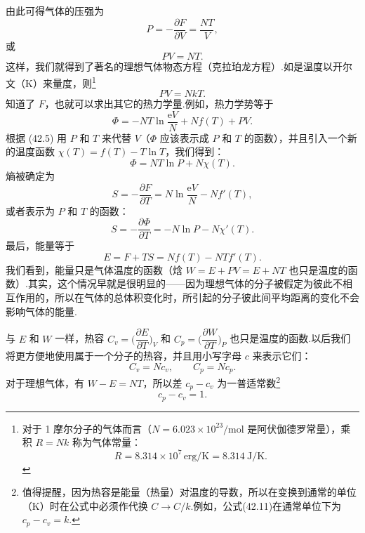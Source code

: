 由此可得气体的压强为
\begin{equation*}
  P=-\frac{\partial F}{\partial V}=\frac{NT}{V},
\end{equation*}
或
\begin{equation}
  PV=NT.
\end{equation}
这样，我们就得到了著名的理想气体物态方程（克拉珀龙方程）.如是温度以开尔文（K）来量度，则\footnote{对于 1 摩尔分子的气体而言（$N=6.023\times10^{23}/\mathrm{mol}$ 是阿伏伽德罗常量），乘积 $R=Nk$ 称为气体常量：
\begin{equation*}
  R=8.314\times10^{7}\,\mathrm{erg/K}=8.314\ \mathrm{J/K}.
\end{equation*}}
\begin{equation*}
  PV=NkT.\tag{42.5a}
\end{equation*}
知道了 $F$，也就可以求出其它的热力学量.例如，热力学势等于
\begin{equation*}
  \Phi=-NT\ln\frac{\mathrm{e}V}{N}+Nf(T)+PV.
\end{equation*}
根据 (42.5) 用 $P$ 和 $T$ 来代替 $V$（$\Phi$ 应该表示成 $P$ 和 $T$ 的函数），并且引入一个新的温度函数 $\chi(T)=f(T)-T\ln T$，我们得到：
\begin{equation}
  \Phi=NT\ln P+N\chi(T).
\end{equation}
熵被确定为
\begin{equation}
  S=-\frac{\partial F}{\partial T}
  =N\ln\frac{\mathrm{e}V}{N}-Nf'(T),
\end{equation}
或者表示为 $P$ 和 $T$ 的函数：
\begin{equation}
  S=-\frac{\partial\Phi}{\partial T}=-N\ln P-N\chi'(T).
\end{equation}
最后，能量等于
\begin{equation}
  E=F+TS=Nf(T)-NTf'(T).
\end{equation}
我们看到，能量只是气体温度的函数（焓 $W=E+PV=E+NT$ 也只是温度的函数）.其实，这个情况早就是很明显的——因为理想气体的分子被假定为彼此不相互作用的，所以在气体的总体积变化时，所引起的分子彼此间平均距离的变化不会影响气体的能量.

与 $E$ 和 $W$ 一样，热容 $C_v=\Big(\dfrac{\partial E}{\partial T}\Big)_V$ 和 $C_p=\Big(\dfrac{\partial W}{\partial T}\Big)_P$ 也只是温度的函数.以后我们将更方便地使用属于一个分子的热容，并且用小写字母 $c$ 来表示它们：
\begin{equation}
  C_v=Nc_v,\qquad C_p=Nc_p.
\end{equation}
对于理想气体，有 $W-E=NT$，所以差 $c_p-c_v$ 为一普适常数\footnote{值得提醒，因为热容是能量（热量）对温度的导数，所以在变换到通常的单位（K）时在公式中必须作代换 $C\to C/k$.例如，公式(42.11)在通常单位下为 $c_p-c_v=k$.}
\begin{equation}
  c_p-c_v=1.
\end{equation}


